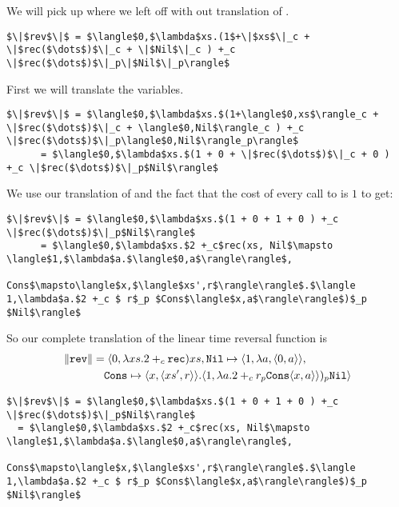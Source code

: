 We will pick up where we left off with out translation of .
%
\begin{lstlisting}
$\|$rev$\|$ = $\langle$0,$\lambda$xs.(1$+\|$xs$\|_c + \|$rec($\dots$)$\|_c + \|$Nil$\|_c ) +_c \|$rec($\dots$)$\|_p\|$Nil$\|_p\rangle$
\end{lstlisting}
%
First we will translate the variables.
%
\begin{lstlisting}
$\|$rev$\|$ = $\langle$0,$\lambda$xs.$(1+\langle$0,xs$\rangle_c + \|$rec($\dots$)$\|_c + \langle$0,Nil$\rangle_c ) +_c \|$rec($\dots$)$\|_p\langle$0,Nil$\rangle_p\rangle$
      = $\langle$0,$\lambda$xs.$(1 + 0 + \|$rec($\dots$)$\|_c + 0 ) +_c \|$rec($\dots$)$\|_p$Nil$\rangle$
\end{lstlisting}
%
We use our translation of  and the fact that the cost of every call to  is $1$ to get:
%
\begin{lstlisting}
$\|$rev$\|$ = $\langle$0,$\lambda$xs.$(1 + 0 + 1 + 0 ) +_c \|$rec($\dots$)$\|_p$Nil$\rangle$
      = $\langle$0,$\lambda$xs.$2 +_c$rec(xs, Nil$\mapsto \langle$1,$\lambda$a.$\langle$0,a$\rangle\rangle$,
                      Cons$\mapsto\langle$x,$\langle$xs',r$\rangle\rangle$.$\langle 1,\lambda$a.$2 +_c $ r$_p $Cons$\langle$x,a$\rangle\rangle$)$_p $Nil$\rangle$
\end{lstlisting}
%

So our complete translation of the linear time reversal function is
\begin{align*}
  \|\texttt{rev}\| &= \langle 0, \lambda xs.2 +_c \texttt{rec})xs, \texttt{Nil}\mapsto \langle 1, \lambda a, \langle 0, a \rangle\rangle,\\
              &\quad \texttt{Cons}\mapsto \langle x, \langle xs', r\rangle\rangle.\langle 1,\lambda a.2 +_c r_p \texttt{Cons}\langle x, a \rangle\rangle)_p \texttt{Nil} \rangle
\end{align*}
%
\begin{framed}
\begin{small}
\begin{lstlisting}
$\|$rev$\|$ = $\langle$0,$\lambda$xs.$(1 + 0 + 1 + 0 ) +_c \|$rec($\dots$)$\|_p$Nil$\rangle$
  = $\langle$0,$\lambda$xs.$2 +_c$rec(xs, Nil$\mapsto \langle$1,$\lambda$a.$\langle$0,a$\rangle\rangle$,
                  Cons$\mapsto\langle$x,$\langle$xs',r$\rangle\rangle$.$\langle 1,\lambda$a.$2 +_c $ r$_p $Cons$\langle$x,a$\rangle\rangle$)$_p $Nil$\rangle$
\end{lstlisting}
\end{small}
\end{framed}

